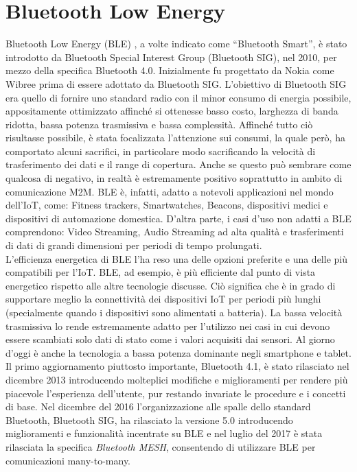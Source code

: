 \section{Bluetooth Low Energy}
Bluetooth Low Energy (BLE) \cite{townsend2014getting}, a volte indicato come ``Bluetooth Smart'', è stato introdotto da Bluetooth Special Interest Group (Bluetooth SIG), nel 2010, per mezzo della specifica Bluetooth 4.0. Inizialmente fu progettato da Nokia come Wibree prima di essere adottato da Bluetooth SIG. 
L'obiettivo di Bluetooth SIG era quello di fornire uno standard radio con il minor consumo di energia possibile, appositamente ottimizzato affinché si ottenesse basso costo, larghezza di banda ridotta, bassa potenza trasmissiva e bassa complessità. 
Affinché tutto ciò risultasse possibile, è stata focalizzata l'attenzione sui consumi, la quale però, ha comportato alcuni sacrifici, in particolare modo sacrificando la velocità di trasferimento dei dati e il range di copertura. Anche se questo può sembrare come qualcosa di negativo, in realtà è estremamente positivo soprattutto in ambito di comunicazione M2M. BLE è, infatti, adatto a notevoli applicazioni nel mondo dell'IoT, come: Fitness trackers, Smartwatches, Beacons, dispositivi medici e dispositivi di automazione domestica. D'altra parte, i casi d'uso non adatti a BLE comprendono: Video Streaming, Audio Streaming ad alta qualità e trasferimenti di dati di grandi dimensioni per periodi di tempo prolungati.\\

\noindent L'efficienza energetica di BLE l'ha reso una delle opzioni preferite e una delle più compatibili per l'IoT. BLE, ad esempio, è più efficiente dal punto di vista energetico rispetto alle altre tecnologie discusse. Ciò significa che è in grado di supportare meglio la connettività dei dispositivi IoT per periodi più lunghi (specialmente quando i dispositivi sono alimentati a batteria). La bassa velocità trasmissiva lo rende estremamente adatto per l'utilizzo nei casi in cui devono essere scambiati solo dati di stato come i valori acquisiti dai sensori. Al giorno d'oggi è anche la tecnologia a bassa potenza dominante negli smartphone e tablet.\\

\noindent Il primo aggiornamento piuttosto importante, Bluetooth 4.1, è stato rilasciato nel dicembre 2013 introducendo molteplici modifiche e miglioramenti per rendere più piacevole l'esperienza dell'utente, pur restando invariate le procedure e i concetti di base. Nel dicembre del 2016 l'organizzazione alle spalle dello standard Bluetooth, Bluetooth SIG, ha rilasciato la versione 5.0 \cite{afaneh2018intro} introducendo miglioramenti e funzionalità incentrate su BLE e nel luglio del 2017 è stata rilasciata la specifica \textit{Bluetooth MESH}, consentendo di utilizzare BLE per comunicazioni many-to-many.\\

